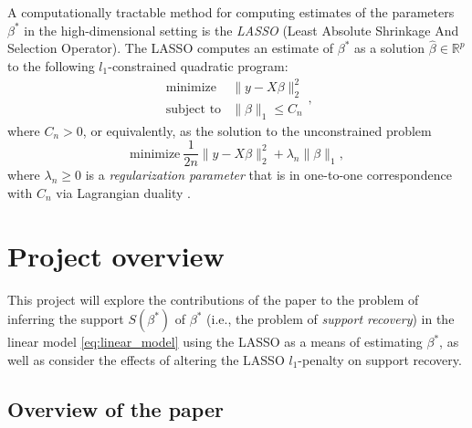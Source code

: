 \documentclass[letterpaper,12pt]{article}
\newcommand{\norm}[1]{\lVert#1\rVert}
\begin{document}
A computationally tractable method for computing estimates of the
parameters $\beta^\ast$ in the high-dimensional setting is the
\textit{LASSO} \cite{tibshirani96} (Least Absolute Shrinkage And
Selection Operator). The LASSO computes an estimate of $\beta^\ast$ as
a solution $\hat{\beta} \in \mathbb{R}^p$ to the following
$l_1$-constrained quadratic program:
\begin{equation} \label{eq:constrained_problem}
  \begin{array}{ll}
    \text{minimize} & \norm{y - X\beta}_2^2 \\
    \text{subject to}
      & \norm{\beta}_1 \leq C_n
  \end{array},
\end{equation}
where $C_n > 0$, or equivalently, as the solution to the unconstrained
problem
\begin{equation} \label{eq:unconstrained_problem}
  \text{minimize} \
    \frac{1}{2n} \norm{y - X\beta}_2^2 + \lambda_n \norm{\beta}_1,
\end{equation}
where $\lambda_n \geq 0$ is a \textit{regularization parameter} that
is in one-to-one correspondence with $C_n$ via Lagrangian duality
\cite{wainwright06}.

\section*{Project overview}

This project will explore the contributions of the paper
\cite{wainwright06} to the problem of inferring the support
$S(\beta^\ast)$ of $\beta^\ast$ (i.e., the problem of \textit{support
  recovery}) in the linear model \eqref{eq:linear_model} using the
LASSO as a means of estimating $\beta^\ast$, as well as consider the
effects of altering the LASSO $l_1$-penalty on support recovery.

\subsection*{Overview of the paper}
\end{document}
